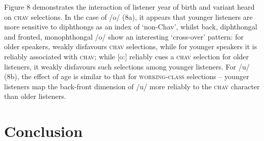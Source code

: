 \documentclass[PWPL]{article}
\begin{document}
Figure 8 demonstrates the interaction of listener year of birth and variant heard on \textsc{chav} selections. In the case of /o/ (8a), it appears that younger listeners are more sensitive to diphthongs as an index of `non-Chav', whilst back, diphthongal and fronted, monophthongal /o/ show an interesting `cross-over' pattern: for older speakers, \textipa{[oU]} weakly disfavours \textsc{chav} selections, while for younger speakers it is reliably associated with \textsc{chav}; while [o:] reliably cues a \textsc{chav} selection for older listeners, it weakly disfavours such selections among younger listeners. For /u/ (8b), the effect of age is similar to that for \textsc{working-class} selections -- younger listeners map the back-front dimension of /u/ more reliably to the \textsc{chav} character than older listeners. 
\section{Conclusion}


\nocite{*}

\end{document}
